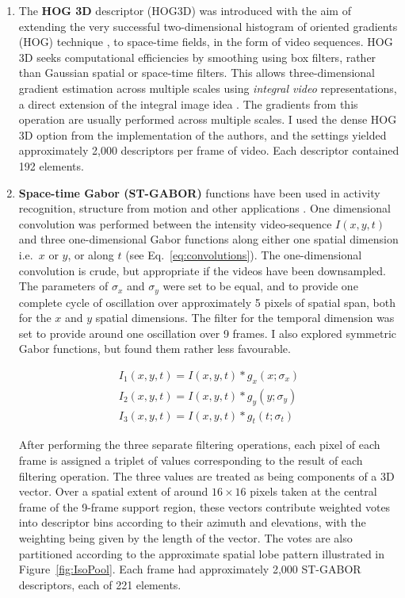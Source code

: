 \begin{enumerate}
\item The \textbf{HOG 3D} descriptor (HOG3D) \citep{Klaser2008} was introduced with the aim of extending the very successful two-di\-men\-sio\-nal histogram of oriented gradients (HOG) technique \citep{Dalal}, to space-time fields, in the form of video sequences.  HOG 3D seeks computational efficiencies by smoothing using box filters, rather than Gaussian spatial or space-time filters.  This allows three-dimensional gradient estimation across multiple scales using {\em integral video} representations, a direct extension of the integral image idea \citep{Viola2001}.  The gradients from this operation are usually performed across multiple scales.  I used the dense HOG 3D option from the implementation of the authors, and the settings yielded approximately 2,000  descriptors per frame of video. Each descriptor contained 192 elements.


\item \textbf{Space-time Gabor (ST-GABOR)} functions have been used in activity recognition, structure from motion and other applications \cite{Bregonzio2009}.  One dimensional convolution was performed between the intensity video-sequence $I(x,y,t)$ and three one-dimensional Gabor functions along either one spatial dimension i.e.\ $x$ or $y$, or along $t$ (see Eq.~\ref{eq:convolutions}).  The one-dimensional convolution  is crude, but appropriate if the videos have been downsampled. The parameters of $\sigma_x$ and $\sigma_y$ were set to be equal, and to provide one complete cycle of oscillation over approximately 5 pixels of spatial span, both for the $x$ and $y$ spatial dimensions. The filter for the temporal dimension was set to provide  around one oscillation over 9 frames.  I also explored symmetric Gabor functions, but found them rather less favourable.


\begin{equation}
\begin{array}{c}
I_1(x,y,t) = I(x,y,t) \ast g_x(x;\sigma_x) \\

I_2(x,y,t) = I(x,y,t) \ast g_y(y;\sigma_y) \\

I_3(x,y,t) = I(x,y,t) \ast g_t(t;\sigma_t)

\end{array}
\label{eq:convolutions}
\end{equation}


After performing the three separate filtering operations, each pixel of each frame is assigned a triplet of values corresponding to the result of each filtering operation.  The three values are treated as being components of a 3D vector.  Over a spatial extent of around $16 \times 16$ pixels taken at the central frame of the 9-frame support region, these vectors contribute weighted votes into descriptor bins according to their azimuth and elevations, with the weighting being given by the length of the vector.  The votes are also partitioned according to the approximate spatial lobe pattern illustrated in Figure~\ref{fig:IsoPool}. Each frame had approximately 2,000 ST-GABOR descriptors, each of 221 elements.



\end{enumerate}
